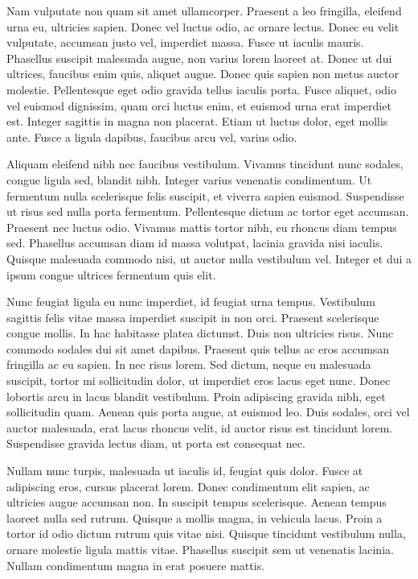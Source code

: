 \documentclass[2pt,a4paper,twoside ]{article}
\begin{document}
\begin{multicols}{2}
Nam vulputate non quam sit amet ullamcorper. Praesent a leo fringilla, eleifend urna eu, ultricies sapien. Donec vel luctus odio, ac ornare lectus. Donec eu velit vulputate, accumsan justo vel, imperdiet massa. Fusce ut iaculis mauris. Phasellus suscipit malesuada augue, non varius lorem laoreet at. Donec ut dui ultrices, faucibus enim quis, aliquet augue. Donec quis sapien non metus auctor molestie. Pellentesque eget odio gravida tellus iaculis porta. Fusce aliquet, odio vel euismod dignissim, quam orci luctus enim, et euismod urna erat imperdiet est. Integer sagittis in magna non placerat. Etiam ut luctus dolor, eget mollis ante. Fusce a ligula dapibus, faucibus arcu vel, varius odio.

Aliquam eleifend nibh nec faucibus vestibulum. Vivamus tincidunt nunc sodales, congue ligula sed, blandit nibh. Integer varius venenatis condimentum. Ut fermentum nulla scelerisque felis suscipit, et viverra sapien euismod. Suspendisse ut risus sed nulla porta fermentum. Pellentesque dictum ac tortor eget accumsan. Praesent nec luctus odio. Vivamus mattis tortor nibh, eu rhoncus diam tempus sed. Phasellus accumsan diam id massa volutpat, lacinia gravida nisi iaculis. Quisque malesuada commodo nisi, ut auctor nulla vestibulum vel. Integer et dui a ipsum congue ultrices fermentum quis elit.

Nunc feugiat ligula eu nunc imperdiet, id feugiat urna tempus. Vestibulum sagittis felis vitae massa imperdiet suscipit in non orci. Praesent scelerisque congue mollis. In hac habitasse platea dictumst. Duis non ultricies risus. Nunc commodo sodales dui sit amet dapibus. Praesent quis tellus ac eros accumsan fringilla ac eu sapien. In nec risus lorem. Sed dictum, neque eu malesuada suscipit, tortor mi sollicitudin dolor, ut imperdiet eros lacus eget nunc. Donec lobortis arcu in lacus blandit vestibulum. Proin adipiscing gravida nibh, eget sollicitudin quam. Aenean quis porta augue, at euismod leo. Duis sodales, orci vel auctor malesuada, erat lacus rhoncus velit, id auctor risus est tincidunt lorem. Suspendisse gravida lectus diam, ut porta est consequat nec.

Nullam nunc turpis, malesuada ut iaculis id, feugiat quis dolor. Fusce at adipiscing eros, cursus placerat lorem. Donec condimentum elit sapien, ac ultricies augue accumsan non. In suscipit tempus scelerisque. Aenean tempus laoreet nulla sed rutrum. Quisque a mollis magna, in vehicula lacus. Proin a tortor id odio dictum rutrum quis vitae nisi. Quisque tincidunt vestibulum nulla, ornare molestie ligula mattis vitae. Phasellus suscipit sem ut venenatis lacinia. Nullam condimentum magna in erat posuere mattis.


\end{multicols}
\end{document}
